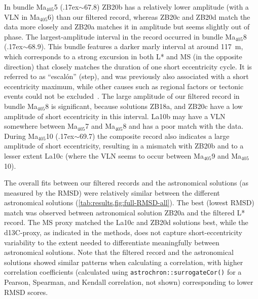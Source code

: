 \documentclass[draft]{agujournal2019}
\newcommand{\appr}{\raise.17ex\hbox{\(\scriptstyle\sim\)}} %
\newcommand{\ma}[1]{Ma\(_{405}\)#1} %
\begin{document}
In bundle \ma{5} (\appr\qty{67.8}{\millionyearago}) ZB20b has a relatively lower amplitude (with a \gls{VLN} in \ma{6}) than our filtered record, whereas ZB20c and ZB20d match the data more closely and ZB20a matches it in amplitude but seems slightly out of phase.
The largest-amplitude interval in the record occurred in bundle \ma{8} (\appr\qty{68.9}{\millionyearago}).
This bundle features a darker marly interval at around \qty{117}{\metre}, which corresponds to a strong excursion in both \gls{L*} and \gls{MS} (in the opposite direction) that closely matches the duration of one short eccentricity cycle.
It is referred to as ``escal\'{o}n'' (step), and was previously also associated with a short eccentricity maximum, while other causes such as regional factors or tectonic events could not be excluded~\cite{Dinares-Turell2013}.
The large amplitude of our filtered record in bundle \ma{8} is significant, because solutions ZB18a, and ZB20c have a low amplitude of short eccentricity in this interval.
La10b may have a \gls{VLN} somewhere between \ma{7} and \ma{8} and has a poor match with the data.
During \ma{10} (\appr\qty{69.7}{\millionyearago}) the composite record also indicates a large amplitude of short eccentricity, resulting in a mismatch with ZB20b and to a lesser extent La10c (where the \gls{VLN} seems to occur between \ma{9} and \ma{10}).

The overall fits between our filtered records and the astronomical solutions (as measured by the \gls{RMSD}) were relatively similar between the different astronomical solutions (\cref{tab:results,fig:full-RMSD-all}).
The best (lowest \gls{RMSD}) match was observed between astronomical solution ZB20a and the filtered \gls{L*} record.
The \gls{MS} proxy matched the La10c and ZB20d solutions best, while
the \gls{d13C}-proxy, as indicated in the methods, does not capture short-eccentricity variability to the extent needed to differentiate meaningfully between astronomical solutions.
Note that the filtered record and the astronomical solutions showed similar patterns when calculating a correlation, with higher correlation coefficients (calculated using \texttt{astrochron::surrogateCor()} for a Pearson, Spearman, and Kendall correlation, not shown) corresponding to lower \gls{RMSD} scores.
\end{document}
